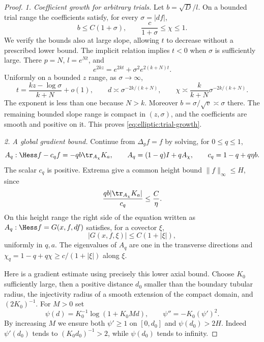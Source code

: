 \begin{proof}
\emph{1. Coefficient growth for arbitrary trials.}
Let $b=\sqrt D/l$.  On a bounded trial range the coefficients satisfy,
for every $\sigma=|df|$,
\begin{equation}\label{eq:elliptic:trial-growth}
 b\le C(1+\sigma),\qquad
 \frac{c}{1+\sigma}\le\chi\le1.
\end{equation}
We verify the bounds also at large slope, allowing $t$ to decrease
without a prescribed lower bound.
The implicit relation implies $t<0$ when $\sigma$ is sufficiently large.
There $p=N$, $l=e^{Nt}$, and
\[
 e^{2kz}=e^{2kt}+\sigma^2e^{2(k+N)t}.
\]
Uniformly on a bounded $z$ range, as $\sigma\to\infty$,
\[
 t=\frac{kz-\log\sigma}{k+N}+o(1),\qquad
 d\asymp\sigma^{-2k/(k+N)},\qquad
 \chi\asymp\frac{k}{k+N}\sigma^{-2k/(k+N)}.
\]
The exponent is less than one because $N>k$.
Moreover $b=\sigma/\sqrt v\asymp\sigma$ there.
The remaining bounded slope range is compact in $(z,\sigma)$, and
the coefficients are smooth and positive on it.  This proves
\eqref{eq:elliptic:trial-growth}.

\medskip\noindent\emph{2. A global gradient bound.}
Continue from $\Delta_g f=f$ by solving, for $0\le q\le1$,
\begin{equation}\label{eq:elliptic:trace-continuation}
 A_q:\Hess f-c_q f=-q b\tr_{A_\chi}K_a,
 \qquad A_q=(1-q)I+qA_\chi,
 \qquad c_q=1-q+q\eta b.
\end{equation}
The scalar $c_q$ is positive.  Extrema give a common height bound
$\|f\|_\infty\le H$, since
\[
 \frac{q b|\tr_{A_\chi}K_a|}{c_q}\le\frac C\eta.
\]
On this height range the right side of the equation written as
$A_q:\Hess f=G(x,f,df)$ satisfies, for a covector $\xi$,
\begin{equation}\label{eq:elliptic:trial-forcing}
 |G(x,f,\xi)|\le C(1+|\xi|),
\end{equation}
uniformly in $q,a$.  The eigenvalues of $A_q$ are one in the
transverse directions and $\chi_q=1-q+q\chi\ge c/(1+|\xi|)$ along $\xi$.

Here is a gradient estimate using precisely this lower axial bound.
Choose $K_0$ sufficiently large, then a positive distance $d_0$ smaller
than the boundary tubular radius, the injectivity radius of a smooth
extension of the compact domain, and $(2K_0)^{-1}$.
For $M>0$ set
\begin{equation}\label{eq:elliptic:log-modulus}
 \psi(d)=K_0^{-1}\log(1+K_0Md),\qquad
 \psi''=-K_0(\psi')^2.
\end{equation}
By increasing $M$ we ensure both $\psi'\ge1$ on $[0,d_0]$ and
$\psi(d_0)>2H$.  Indeed $\psi'(d_0)$ tends to
$(K_0d_0)^{-1}>2$, while $\psi(d_0)$ tends to infinity.


\end{proof}
